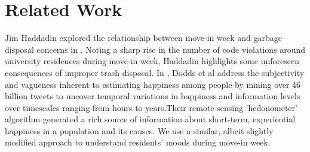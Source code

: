 \documentclass[journal, a4paper]{IEEEtran}
\begin{document}

\section{Related Work}
    Jim Haddadin explored the relationship between move-in week and garbage disposal concerns in \cite{trashcity}. Noting a sharp rise in the number of code violations around university residences during move-in week, Haddadin highlights some unforeseen consequences of improper trash disposal. In \cite{happytext}, Dodds et al address the subjectivity and vagueness inherent to estimating happiness among people by mining over 46 billion tweets to uncover temporal variations in happiness and information levels over timescales ranging from hours to years.Their remote-sensing 'hedonometer' algorithm generated a rich source of information about short-term, experiential happiness in a population and its causes. We use a similar, albeit slightly modified approach to understand residents' moods during move-in week.
\end{document}

